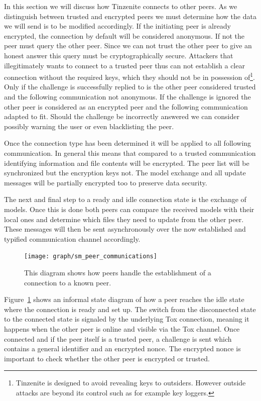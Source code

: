 In this section we will discuss how Tinzenite connects to other peers.
As we distinguish between trusted and encrypted peers we must determine how the data we will send is to be modified accordingly.
If the initiating peer is already encrypted, the connection by default will be considered anonymous.
If not the peer must query the other peer.
Since we can not trust the other peer to give an honest answer this query must be cryptographically secure.
Attackers that illegitimately wants to connect to a trusted peer thus can not establish a clear connection without the required keys, which they should not be in possession of\footnote{Tinzenite is designed to avoid revealing keys to outsiders. However outside attacks are beyond its control such as for example key loggers.}.
Only if the challenge is successfully replied to is the other peer considered trusted and the following communication not anonymous.
If the challenge is ignored the other peer is considered as an encrypted peer and the following communication adapted to fit.
Should the challenge be incorrectly answered we can consider possibly warning the user or even blacklisting the peer.

Once the connection type has been determined it will be applied to all following communication.
In general this means that compared to a trusted communication identifying information and file contents will be encrypted.
The peer list will be synchronized but the encryption keys not.
The model exchange and all update messages will be partially encrypted too to preserve data security.

The next and final step to a ready and idle connection state is the exchange of models.
Once this is done both peers can compare the received models with their local ones and determine which files they need to update from the other peer.
These messages will then be sent asynchronously over the now established and typified communication channel accordingly.

\begin{figure}[htp]
\centering
    \texttt{[image: graph/sm\_peer\_communications]}
\caption[Connection State Diagram]{This diagram shows how peers handle the establishment of a connection to a known peer.}
\label{graph:connection_states}
\end{figure}

Figure~\ref{graph:connection_states} shows an informal state diagram of how a peer reaches the idle state where the connection is ready and set up.
The switch from the disconnected state to the connected state is signaled by the underlying Tox connection, meaning it happens when the other peer is online and visible via the Tox channel.
Once connected and if the peer itself is a trusted peer, a challenge is sent which contains a general identifier and an encrypted nonce.
The encrypted nonce is important to check whether the other peer is encrypted or trusted.


